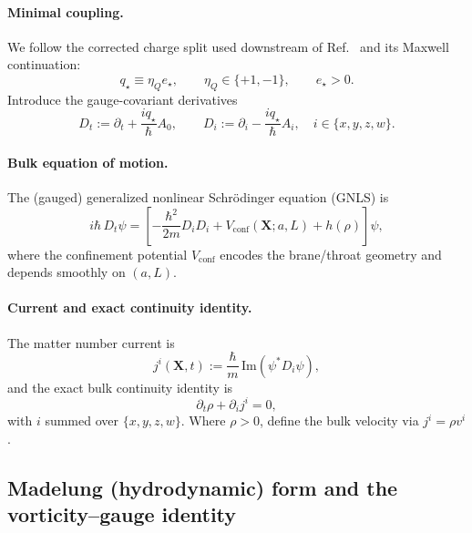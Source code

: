 \documentclass[11pt]{article}
\newcommand{\etaQ}{\eta_Q}
\newcommand{\estar}{e_\star}
\newcommand{\qstar}{q_\star}
\begin{document}
\paragraph{Minimal coupling.}
We follow the corrected charge split used downstream of Ref.~\cite{norris2026_4d_model} and its Maxwell continuation:
\begin{equation}
\qstar \equiv \etaQ \estar,
\qquad
\etaQ\in\{+1,-1\},
\qquad
\estar>0.
\end{equation}
Introduce the gauge-covariant derivatives
\begin{equation}
D_t := \partial_t + \frac{i \qstar}{\hbar}A_0,
\qquad
D_i := \partial_i - \frac{i \qstar}{\hbar}A_i,\quad i\in\{x,y,z,w\}.
\label{eq:recap_cov_derivs}
\end{equation}

\paragraph{Bulk equation of motion.}
The (gauged) generalized nonlinear Schr\"odinger equation (GNLS) is
\begin{equation}
\boxed{
i\hbar\,D_t\psi
=
\left[
-\frac{\hbar^2}{2m}D_iD_i
+V_{\mathrm{conf}}(\mathbf{X};a,L)
+h(\rho)
\right]\psi,
}
\label{eq:recap_gnls}
\end{equation}
where the confinement potential $V_{\mathrm{conf}}$ encodes the brane/throat geometry and depends smoothly on $(a,L)$.

\paragraph{Current and exact continuity identity.}
The matter number current is
\begin{equation}
\boxed{
j^i(\mathbf{X},t)
:=
\frac{\hbar}{m}\,\mathrm{Im}\!\left(\psi^*D_i\psi\right),
}
\label{eq:recap_number_current}
\end{equation}
and the exact bulk continuity identity is
\begin{equation}
\boxed{
\partial_t\rho + \partial_i j^i = 0,
}
\label{eq:recap_bulk_continuity}
\end{equation}
with $i$ summed over $\{x,y,z,w\}$. Where $\rho>0$, define the bulk velocity via $j^i=\rho v^i$.

\subsection{Madelung (hydrodynamic) form and the vorticity--gauge identity}
\label{sec:recap_madelung}
\end{document}
